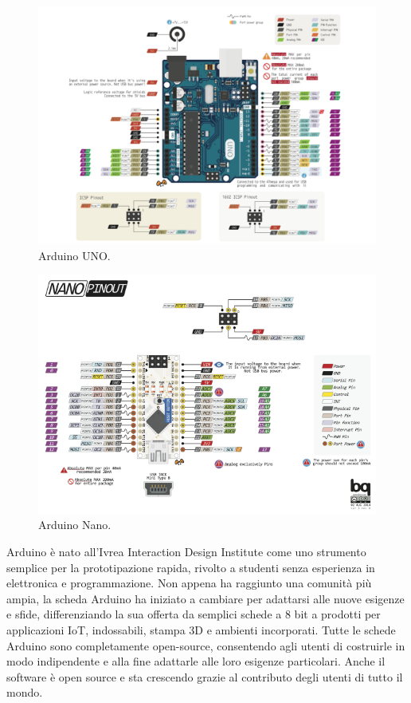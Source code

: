 \documentclass[12pt,oneside,a4paper]{article}
\begin{document}
\begin{figure}[!htb]
    \centering
    \includegraphics[width=0.90\linewidth]{figures/arduinoUNO.png}
    \caption{Arduino UNO.}
\end{figure}

\begin{figure}[!htb]
    \centering
    \includegraphics[width=0.90\linewidth]{figures/arduinoNANO.png}
    \caption{Arduino Nano.}
\end{figure}
Arduino è nato all'Ivrea Interaction Design Institute come uno strumento semplice per la prototipazione rapida, rivolto a studenti senza esperienza in elettronica e programmazione. Non appena ha raggiunto una comunità più ampia, la scheda Arduino ha iniziato a cambiare per adattarsi alle nuove esigenze e sfide, differenziando la sua offerta da semplici schede a 8 bit a prodotti per applicazioni IoT, indossabili, stampa 3D e ambienti incorporati. Tutte le schede Arduino sono completamente open-source, consentendo agli utenti di costruirle in modo indipendente e alla fine adattarle alle loro esigenze particolari. Anche il software è open source e sta crescendo grazie al contributo degli utenti di tutto il mondo.
\end{document}
